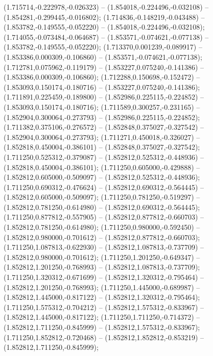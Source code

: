  (1.715714,-0.222978,-0.026323) -- (1.854018,-0.224496,-0.032108) -- (1.854281,-0.299445,-0.016802);
 (1.714836,-0.148219,-0.043488) -- (1.853782,-0.149555,-0.052220) -- (1.854018,-0.224496,-0.032108);
 (1.714055,-0.073484,-0.064687) -- (1.853571,-0.074621,-0.077138) -- (1.853782,-0.149555,-0.052220);
 (1.713370,0.001239,-0.089917) -- (1.853386,0.000309,-0.106860) -- (1.853571,-0.074621,-0.077138);
 (1.712781,0.075962,-0.119179) -- (1.853227,0.075240,-0.141386) -- (1.853386,0.000309,-0.106860);
 (1.712288,0.150698,-0.152472) -- (1.853093,0.150174,-0.180716) -- (1.853227,0.075240,-0.141386);
 (1.711891,0.225459,-0.189800) -- (1.852986,0.225115,-0.224852) -- (1.853093,0.150174,-0.180716);
 (1.711589,0.300257,-0.231165) -- (1.852904,0.300064,-0.273793) -- (1.852986,0.225115,-0.224852);
 (1.711382,0.375106,-0.276572) -- (1.852848,0.375027,-0.327542) -- (1.852904,0.300064,-0.273793);
 (1.711271,0.450018,-0.326027) -- (1.852818,0.450004,-0.386101) -- (1.852848,0.375027,-0.327542);
 (1.711250,0.525312,-0.379087) -- (1.852812,0.525312,-0.448936) -- (1.852818,0.450004,-0.386101);
 (1.711250,0.605000,-0.429888) -- (1.852812,0.605000,-0.509097) -- (1.852812,0.525312,-0.448936);
 (1.711250,0.690312,-0.476624) -- (1.852812,0.690312,-0.564445) -- (1.852812,0.605000,-0.509097);
 (1.711250,0.781250,-0.519297) -- (1.852812,0.781250,-0.614980) -- (1.852812,0.690312,-0.564445);
 (1.711250,0.877812,-0.557905) -- (1.852812,0.877812,-0.660703) -- (1.852812,0.781250,-0.614980);
 (1.711250,0.980000,-0.592450) -- (1.852812,0.980000,-0.701612) -- (1.852812,0.877812,-0.660703);
 (1.711250,1.087813,-0.622930) -- (1.852812,1.087813,-0.737709) -- (1.852812,0.980000,-0.701612);
 (1.711250,1.201250,-0.649347) -- (1.852812,1.201250,-0.768993) -- (1.852812,1.087813,-0.737709);
 (1.711250,1.320312,-0.671699) -- (1.852812,1.320312,-0.795464) -- (1.852812,1.201250,-0.768993);
 (1.711250,1.445000,-0.689987) -- (1.852812,1.445000,-0.817122) -- (1.852812,1.320312,-0.795464);
 (1.711250,1.575312,-0.704212) -- (1.852812,1.575312,-0.833967) -- (1.852812,1.445000,-0.817122);
 (1.711250,1.711250,-0.714372) -- (1.852812,1.711250,-0.845999) -- (1.852812,1.575312,-0.833967);
 (1.711250,1.852812,-0.720468) -- (1.852812,1.852812,-0.853219) -- (1.852812,1.711250,-0.845999);
